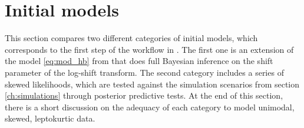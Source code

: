 \section{Initial models}
\label{ch:initial}
This section compares two different categories of initial models, which corresponds to the first step of the workflow in \cite{gelman_bayesian_2020}.
The first one is an extension of the model \ref{eq:mod_hb} from \cite{morelli_hierarchical_2021} that does full Bayesian inference on the shift parameter of the log-shift transform.
The second category includes a series of skewed likelihoods, which are tested against the simulation scenarios from section \ref{ch:simulations} through posterior predictive tests.
At the end of this section, there is a short discussion on the adequacy of each category to model unimodal, skewed, leptokurtic data.



